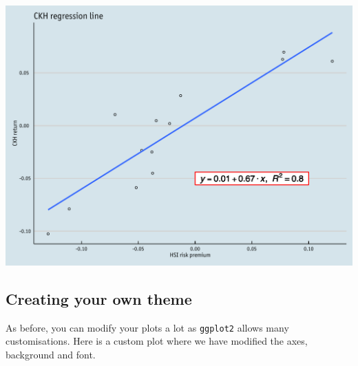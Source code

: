 \begin{Shaded}
\begin{Highlighting}[]
\StringTok{        } \NormalTok{(} \NormalTok{), }
\StringTok{        } \NormalTok{(), }
\StringTok{        } \NormalTok{(), } \NormalTok{(),}
\StringTok{        } \NormalTok{(} \NormalTok{),}
\StringTok{        }\NormalTok{(}\NormalTok{))}
\end{Highlighting}
\end{Shaded}

\begin{center}\includegraphics[width=0.55\linewidth]{figures/lr_16-1} \end{center}

\subsection{Creating your own
theme}\label{creating-your-own-theme-10}

As before, you can modify your plots a lot as \texttt{ggplot2} allows
many customisations. Here is a custom plot where we have modified the
axes, background and font.

